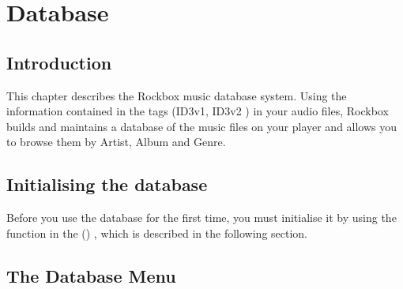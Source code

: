 \section{\label{ref:database}Database}

\subsection{Introduction}
This chapter describes the Rockbox music database system. Using the information
contained in the tags (ID3v1, ID3v2%
) in your audio files, Rockbox builds and maintains a database of the music
files on your player and allows you to browse them by Artist, Album and Genre.

\subsection{Initialising the database}
Before you use the database for the first time, you must initialise it by using
the  function in the 
()
, which is described in the following section.

\subsection{\label{ref:databasemenu}The Database Menu}

